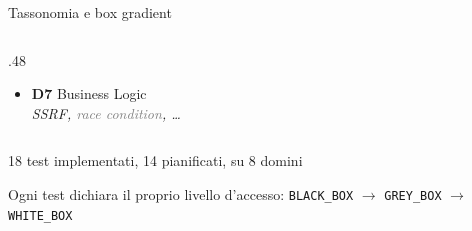 \begin{frame}{Tassonomia e box gradient}
\begin{columns}
\begin{column}{.48\textwidth}
\begin{itemize}
                        \item \textbf{D7} \alert{Business Logic}\\
                              {\scriptsize\itshape SSRF, \textcolor{gray}{race condition}, \dots}
                  \end{itemize}
            \end{column}
      \end{columns}

      \vspace{0.4em}
      \begin{center}
            \small \alert{18 test implementati}, 14 pianificati, su 8 domini
      \end{center}

      \begin{center}
            \small Ogni \alert{test} dichiara il proprio livello d'accesso: \texttt{BLACK\_BOX} $\rightarrow$ \texttt{GREY\_BOX} $\rightarrow$ \texttt{WHITE\_BOX}
      \end{center}
\end{frame}